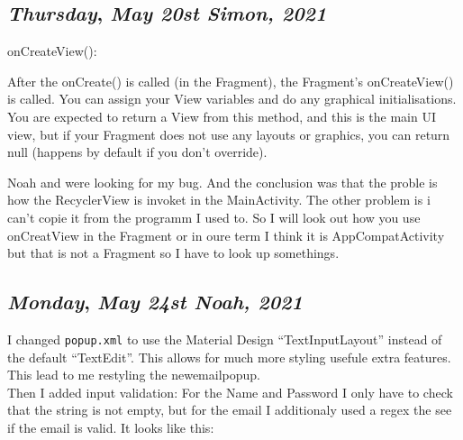 \begin{center}
\section*{\month}
\end{center}

\def\day{\textit{May 20st Simon, 2021}}
\def\weekday{\textit{Thursday}}
\subsection*{\weekday, \day}

onCreateView():

After the onCreate() is called (in the Fragment), the Fragment's onCreateView() is called. You can assign your View variables and do any graphical initialisations. You are expected to return a View from this method, and this is the main UI view, but if your Fragment does not use any layouts or graphics, you can return null (happens by default if you don't override).

Noah and were looking for my bug. And the conclusion was that the proble is how the RecyclerView is invoket in the MainActivity. The other problem is i can't 
copie it from the programm I used to. So I will look out how you use onCreatView in the Fragment or in oure term I think it is AppCompatActivity but that is not a Fragment so 
I have to look up somethings. 

\def\day{\textit{May 24st Noah, 2021}}
\def\weekday{\textit{Monday}}
\subsection*{\weekday, \day}

I changed \texttt{popup.xml} to use the Material Design ``TextInputLayout'' instead of the default ``TextEdit''. This allows for much more styling usefule extra features. This lead to me restyling the newemailpopup.\\

Then I added input validation: For the Name and Password I only have to check that the string is not empty, but for the email I additionaly used a regex the see if the email is valid. It looks like this:\\

